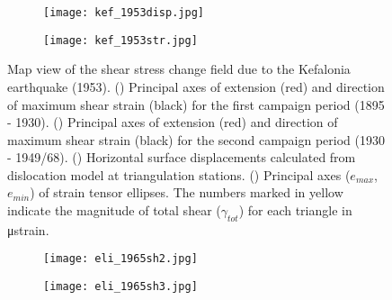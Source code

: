 \begin{extsum}
\begin{figure}[H]
\begin{subfigure}{.49\textwidth}
  \centering
      \texttt{[image: kef\_1953disp.jpg]}
      \caption{}
      \label{fig_e:kef_1953disp}
\end{subfigure}
\begin{subfigure}{.49\textwidth}
\centering
      \texttt{[image: kef\_1953str.jpg]}
      \caption{}
      \label{fig_e:kef_1953str}
\end{subfigure}
\caption{Map view of the shear stress change field due to the Kefalonia earthquake (1953). () Principal axes of extension (red) and direction of maximum shear strain (black) for the first campaign period (1895 - 1930). () Principal axes of extension (red) and direction of maximum shear strain (black) for the second campaign period (1930 - 1949/68). () Horizontal surface displacements calculated from \citet{Okada1985} dislocation model at triangulation stations. () Principal axes (${e}_{max}$, ${e}_{min}$) of strain tensor ellipses. The numbers marked in yellow indicate the magnitude of total shear ($\gamma_{tot}$) for each triangle in μstrain.}
\label{fig_e:kef_1953}
\end{figure}

\begin{figure}[H]
\centering
\begin{subfigure}{.49\textwidth}
  \centering
      \texttt{[image: eli\_1965sh2.jpg]}
      \caption{}
      \label{fig_e:eli_1965sh2}
\end{subfigure}
\begin{subfigure}{.49\textwidth}
\centering
      \texttt{[image: eli\_1965sh3.jpg]}
      \caption{}
      \label{fig_e:eli_1965sh3}
\end{subfigure}


\end{figure}
\end{extsum}
